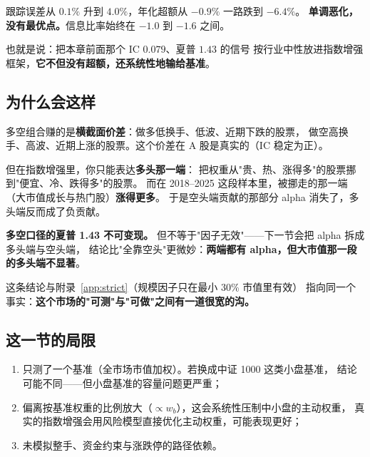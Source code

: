

\begin{warnbox}[这张表推翻了什么]
跟踪误差从 $0.1\%$ 升到 $4.0\%$，年化超额从 $-0.9\%$ 一路跌到 $-6.4\%$。
\textbf{单调恶化，没有最优点。}信息比率始终在 $-1.0$ 到 $-1.6$ 之间。

也就是说：把本章前面那个 IC $0.079$、夏普 $1.43$ 的信号
按行业中性放进指数增强框架，\textbf{它不但没有超额，还系统性地输给基准}。
\end{warnbox}

\subsection{为什么会这样}

多空组合赚的是\textbf{横截面价差}：做多低换手、低波、近期下跌的股票，
做空高换手、高波、近期上涨的股票。这个价差在 A 股是真实的（IC 稳定为正）。

但在指数增强里，你只能表达\textbf{多头那一端}：
把权重从"贵、热、涨得多"的股票挪到"便宜、冷、跌得多"的股票。
而在 2018--2025 这段样本里，被挪走的那一端（大市值成长与热门股）\textbf{涨得更多}。
于是空头端贡献的那部分 alpha 消失了，多头端反而成了负贡献。

\begin{keybox}[这是本项目最重要的一条负面结论]
\textbf{多空口径的夏普 1.43 不可变现。}
但不等于"因子无效"——下一节会把 alpha 拆成多头端与空头端，
结论比"全靠空头"更微妙：\textbf{两端都有 alpha，但大市值那一段的多头端不显著}。

这条结论与附录~\ref{app:strict}（规模因子只在最小 30\% 市值里有效）
指向同一个事实：\textbf{这个市场的"可测"与"可做"之间有一道很宽的沟。}
\end{keybox}

\subsection{这一节的局限}

\begin{enumerate}
  \item 只测了一个基准（全市场市值加权）。若换成中证 1000 这类小盘基准，
        结论可能不同——但小盘基准的容量问题更严重；
  \item 偏离按基准权重的比例放大（$\propto w_b$），这会系统性压制中小盘的主动权重，
        真实的指数增强会用风险模型直接优化主动权重，可能表现更好；
  \item 未模拟整手、资金约束与涨跌停的路径依赖。
\end{enumerate}


